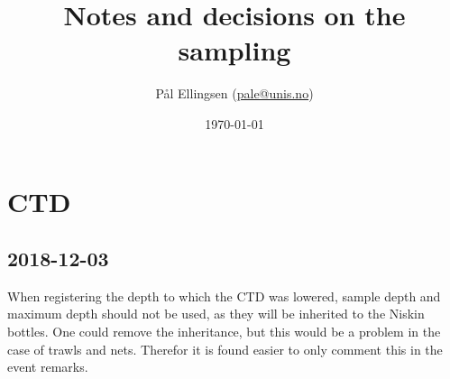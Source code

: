 \documentclass[a4paper,english, 11pt]{article}
\title{Notes and decisions on the sampling}
\date{\today}
\author{Pål Ellingsen (\url{pale@unis.no})}
\begin{document}
\maketitle
\tableofcontents
\section{CTD} %
\label{sec:CTD}

\subsection{2018-12-03} %
\label{sub:2018-12-03}
When registering the depth to which the CTD was lowered, sample depth and maximum depth should not be used, as they will be inherited to the Niskin bottles. One could remove the inheritance, but this would be a problem in the case of trawls and nets. Therefor it is found easier to only comment this in the event remarks. 

\end{document}
